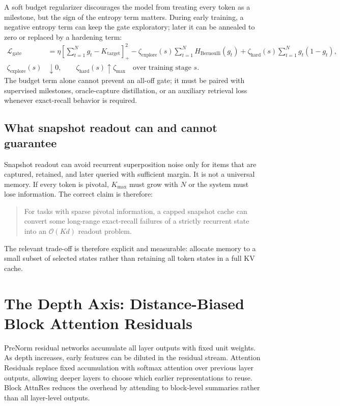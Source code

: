 \documentclass[11pt]{article}
\newcommand{\Oh}{\mathcal{O}}
\begin{document}
A soft budget regularizer discourages the model from treating every token as a milestone, but the sign of the entropy term matters. During early training, a negative entropy term can keep the gate exploratory; later it can be annealed to zero or replaced by a hardening term:
\begin{align}
\label{eq:budget-loss}
\mathcal{L}_{\mathrm{gate}}
&= \eta\left[\sum_{t=1}^{N} g_t - K_{\mathrm{target}}\right]_+^2
- \zeta_{\mathrm{explore}}(s)\sum_{t=1}^{N} H_{\mathrm{Bernoulli}}(g_t)
+ \zeta_{\mathrm{hard}}(s)\sum_{t=1}^{N}g_t(1-g_t), \\
\zeta_{\mathrm{explore}}(s)&\downarrow 0,\qquad
\zeta_{\mathrm{hard}}(s)\uparrow \zeta_{\max}
\quad\text{over training stage }s.
\end{align}
The budget term alone cannot prevent an all-off gate; it must be paired with supervised milestones, oracle-capture distillation, or an auxiliary retrieval loss whenever exact-recall behavior is required.

\subsection{What snapshot readout can and cannot guarantee}

Snapshot readout can avoid recurrent superposition noise only for items that are captured, retained, and later queried with sufficient margin. It is not a universal memory. If every token is pivotal, $K_{\max}$ must grow with $N$ or the system must lose information. The correct claim is therefore:

\begin{quote}
For tasks with sparse pivotal information, a capped snapshot cache can convert some long-range exact-recall failures of a strictly recurrent state into an $\Oh(Kd)$ readout problem.
\end{quote}

The relevant trade-off is therefore explicit and measurable: allocate memory to a small subset of selected states rather than retaining all token states in a full KV cache.

\section{The Depth Axis: Distance-Biased Block Attention Residuals}

PreNorm residual networks accumulate all layer outputs with fixed unit weights. As depth increases, early features can be diluted in the residual stream. Attention Residuals replace fixed accumulation with softmax attention over previous layer outputs, allowing deeper layers to choose which earlier representations to reuse. Block AttnRes reduces the overhead by attending to block-level summaries rather than all layer-level outputs.
\end{document}
